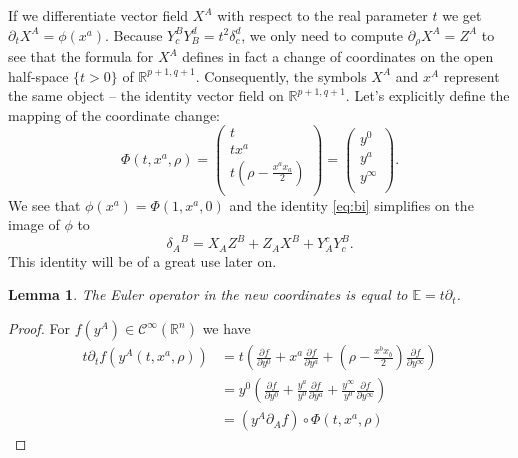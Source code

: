 \documentclass[final]{birkmult}
\newtheorem{lemma}[theorem]{Lemma}
\theoremstyle{definition}
\theoremstyle{remark}
\numberwithin{equation}{section}
\newcommand{\p}[1]{\partial_{#1}}
\newcommand{\pd}[2]{\frac{\partial #1}{\partial #2}}
\newcommand{\aR}{\mathbb{R}^{p+1,q+1}}
\newcommand{\bi}[3][c]{X_{#2} Z^{#3} + Z_{#2} X^{#3} + Y_{#2}^{#1} Y^{#3}_{#1}}
\begin{document}
  If we differentiate vector field $X^A$ with respect to the real parameter $t$ we get $\partial_t X^A = \phi(x^a)$. Because $Y_c^BY_B^d = t^2 \delta_c^d$, we only need to compute $\partial_\rho X^A = Z^A$ to see that the formula for $X^A$ defines in fact a change of coordinates on the open half-space $\{t > 0\}$ of $\aR$. %
  Consequently, the symbols $X^A$ and $x^A$ represent the same object -- the identity vector field on $\aR$. Let's explicitly define the mapping of the coordinate change:
  \begin{equation*}
	  \Phi(t,x^a,\rho) = \begin{pmatrix}t \\ tx^a \\	t(\rho-\frac{x^ax_a}{2}) \\ \end{pmatrix} = \begin{pmatrix} y^0\\ y^a\\ y^\infty \\ \end{pmatrix}.
  \end{equation*}
  We see that  $\phi(x^a) = \Phi(1,x^a,0)$ and the identity \eqref{eq:bi} simplifies on the image of $\phi$ to 
  \[
  {\delta_A}^B = \bi{A}{B}.
  \]
  This identity will be of a great use later on.
\pagebreak[2]
  \begin{lemma}\label{lem:euler_change}
    The Euler operator in the new coordinates is equal to $\mathbb{E} = t\p{t}$.
  \end{lemma}

  \begin{proof} For $f(y^A) \in \mathcal{C}^\infty(\mathbb{R}^n)$ we have
    \begin{align*}
      t \p{t} f (y^A(t,x^a,\rho)) & = t( \pd{f}{y^0} + x^a \pd{f}{y^a} +
      (\rho-\frac{x^bx_b}{2})\pd{f}{y^\infty}  ) \\
	      & = y^0( \pd{f}{y^0} + \frac{y^a}{y^0} \pd{f}{y^a} +
      \frac{y^\infty}{y^0}\pd{f}{y^\infty}  )\\
	      & = (y^A\p{A} f) \circ \Phi(t,x^a,\rho)
    \end{align*}
  \end{proof}
\end{document}
